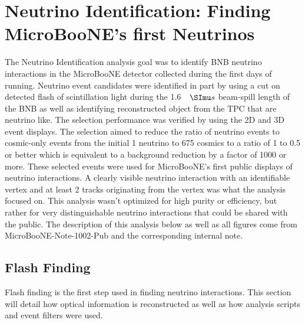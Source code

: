 \chapter{Neutrino Identification: Finding MicroBooNE's first Neutrinos} \label{ch:neutrinoID}
The Neutrino Identification analysis goal was to identify BNB neutrino interactions in the MicroBooNE detector collected during the first days of running. Neutrino event candidates were identified in part by using a cut on detected flash of scintillation light during the 1.6 $\micro s$ beam-spill length of the BNB as well as identifying reconstructed object from the TPC that are neutrino like. The selection performance was verified by using the 2D and 3D event displays. The selection aimed to reduce the ratio of neutrino events to cosmic-only events from the initial 1 neutrino to 675 cosmics to a ratio of 1 to 0.5 or better which is equivalent to a background reduction by a factor of 1000 or more. These selected events were used for MicroBooNE's first public displays of neutrino interactions. A clearly visible neutrino interaction with an identifiable vertex and at least 2 tracks originating from the vertex was what the analysis focused on. This analysis wasn't optimized for high purity or efficiency, but rather for very distinguishable neutrino interactions that could be shared with the public. The description of this analysis below as well as all figures come from MicroBooNE-Note-1002-Pub \cite{neutrinoid} and the corresponding internal note.
\section{Flash Finding}\label{sec:flashfinding}
Flash finding is the first step used in finding neutrino interactions. This section will detail how optical information is reconstructed as well as how analysis scripts and event filters were used.

